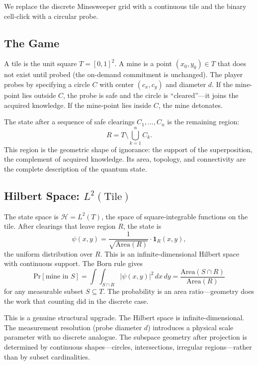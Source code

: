 \documentclass[12pt,a4paper]{article}
\theoremstyle{definition}
\theoremstyle{remark}
\newcommand{\Hil}{\mathcal{H}}
\newcommand{\Prob}{\mathrm{Pr}}
\newcommand{\Area}{\mathrm{Area}}
\begin{document}
We replace the discrete Minesweeper grid with a continuous tile and the binary cell-click with a circular probe.

\subsection{The Game}
\label{sec:continuous-game}

A tile is the unit square $T = [0,1]^2$.  A mine is a point $(x_0, y_0) \in T$ that does not exist until probed (the on-demand commitment is unchanged).  The player probes by specifying a circle $C$ with center $(c_x, c_y)$ and diameter $d$.  If the mine-point lies outside $C$, the probe is safe and the circle is ``cleared''---it joins the acquired knowledge.  If the mine-point lies inside $C$, the mine detonates.

The state after a sequence of safe clearings $C_1, \ldots, C_n$ is the remaining region:
\begin{equation}\label{eq:remaining-region}
  R = T \setminus \bigcup_{k=1}^{n} C_k.
\end{equation}
This region is the geometric shape of ignorance: the support of the superposition, the complement of acquired knowledge.  Its area, topology, and connectivity are the complete description of the quantum state.

\subsection{Hilbert Space: $L^2(\text{Tile})$}

The state space is $\Hil = L^2(T)$, the space of square-integrable functions on the tile.  After clearings that leave region $R$, the state is
\begin{equation}\label{eq:continuous-state}
  \psi(x,y) = \frac{1}{\sqrt{\Area(R)}} \cdot \mathbf{1}_{R}(x,y),
\end{equation}
the uniform distribution over $R$.  This is an infinite-dimensional Hilbert space with continuous support.  The Born rule gives
\begin{equation}\label{eq:continuous-born}
  \Prob[\text{mine in } S] = \int\!\!\int_{S \cap R} |\psi(x,y)|^2 \, dx \, dy = \frac{\Area(S \cap R)}{\Area(R)}
\end{equation}
for any measurable subset $S \subseteq T$.  The probability is an area ratio---geometry does the work that counting did in the discrete case.

This is a genuine structural upgrade.  The Hilbert space is infinite-dimensional.  The measurement resolution (probe diameter $d$) introduces a physical scale parameter with no discrete analogue.  The subspace geometry after projection is determined by continuous shapes---circles, intersections, irregular regions---rather than by subset cardinalities.
\end{document}
